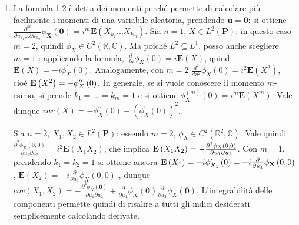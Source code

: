 \documentclass{article}
\begin{document}
\begin{enumerate}
\item La formula 1.2 \`{e} detta dei momenti perch\'{e} permette di
calcolare pi\`{u} facilmente i momenti di una variabile aleatoria, prendendo 
$\mathbf{u=0}$: si ottiene $\frac{\partial ^{m}}{\partial
u_{k_{1}}...\partial u_{k_{m}}}\phi _{\mathbf{X}}\left( \mathbf{0}\right)
=i^{m}\mathbf{E}\left( X_{k_{1}}...X_{k_{m}}\right) $. Sia $n=1$, $X\in
L^{2}\left( \mathbf{P}\right) $: in questo caso $m=2$, quindi $\phi _{X}\in
C^{2}\left( 
\mathbb{R}
,%
\mathbb{C}
\right) $. Ma poich\'{e} $L^{2}\subseteq L^{1}$, posso anche scegliere $m=1$%
: applicando la formula, $\frac{d}{du}\phi _{X}\left( 0\right) =i\mathbf{E}%
\left( X\right) $, quindi $\mathbf{E}\left( X\right) =-i\phi _{X}^{\prime
}\left( 0\right) $. Analogamente, con $m=2$ $\frac{d^{2}}{du^{2}}\phi
_{X}\left( 0\right) =i^{2}\mathbf{E}\left( X^{2}\right) $, cio\`{e} $\mathbf{%
E}\left( X^{2}\right) =-\phi _{X}^{\prime \prime }\left( 0\right) $. In
generale, se si vuole conoscere il momento $m$-esimo, si prende $%
k_{1}=...=k_{m}=1$ e si ottiene $\phi _{X}^{\left( m\right) }\left( 0\right)
=i^{m}\mathbf{E}\left( X^{m}\right) $. Vale dunque $var\left( X\right)
=-\phi _{X}^{\prime \prime }\left( 0\right) +\left( \phi _{X}^{\prime
}\left( 0\right) \right) ^{2}$.

Sia $n=2$, $X_{1},X_{2}\in L^{2}\left( \mathbf{P}\right) $: essendo $m=2$, $%
\phi _{X}\in C^{2}\left( 
\mathbb{R}
^{2},%
\mathbb{C}
\right) $. Vale quindi $\frac{\partial ^{2}\phi _{\mathbf{X}}\left(
0,0\right) }{\partial u_{1}\partial u_{2}}=i^{2}\mathbf{E}\left(
X_{1}X_{2}\right) $, che implica $\mathbf{E}\left( X_{1}X_{2}\right) =-\frac{%
\partial ^{2}\phi _{X}\left( 0,0\right) }{\partial u_{1}\partial u_{2}}$.
Con $m=1$, prendendo $k_{1}=k_{2}=1$ si ottiene ancora $\mathbf{E}\left(
X_{1}\right) =-i\phi _{X_{1}}^{\prime }\left( 0\right) =-i\frac{\partial }{%
\partial u_{1}}\phi _{\mathbf{X}}\left( 0,0\right) $, $\mathbf{E}\left(
X_{2}\right) =-i\frac{\partial }{\partial u_{2}}\phi _{X}\left( 0,0\right) $%
, dunque $cov\left( X_{1},X_{2}\right) =-\frac{\partial ^{2}\phi _{X}\left( 
\mathbf{0}\right) }{\partial u_{1}\partial u_{2}}+\frac{\partial }{\partial
u_{1}}\phi _{X}\left( \mathbf{0}\right) \frac{\partial }{\partial u_{2}}\phi
_{X}\left( \mathbf{0}\right) $. L'integrabilit\`{a} delle componenti
permette quindi di risalire a tutti gli indici desiderati semplicemente
calcolando derivate.


\end{enumerate}
\end{document}
